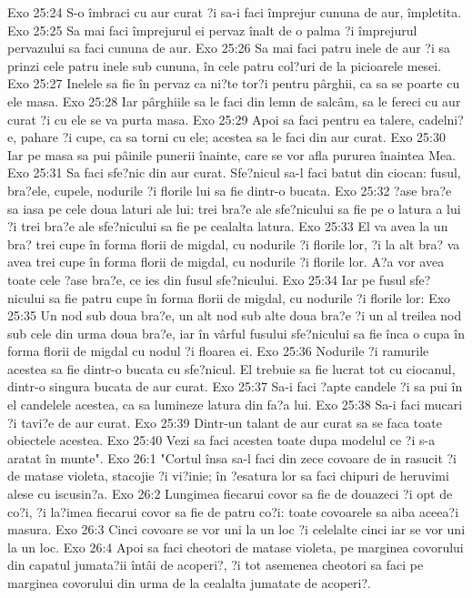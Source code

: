 Exo 25:24  S-o îmbraci cu aur curat ?i sa-i faci împrejur cununa de aur, împletita.
Exo 25:25  Sa mai faci împrejurul ei pervaz înalt de o palma ?i împrejurul pervazului sa faci cununa de aur.
Exo 25:26  Sa mai faci patru inele de aur ?i sa prinzi cele patru inele sub cununa, în cele patru col?uri de la picioarele mesei.
Exo 25:27  Inelele sa fie în pervaz ca ni?te tor?i pentru pârghii, ca sa se poarte cu ele masa.
Exo 25:28  Iar pârghiile sa le faci din lemn de salcâm, sa le fereci cu aur curat ?i cu ele se va purta masa.
Exo 25:29  Apoi sa faci pentru ea talere, cadelni?e, pahare ?i cupe, ca sa torni cu ele; acestea sa le faci din aur curat.
Exo 25:30  Iar pe masa sa pui pâinile punerii înainte, care se vor afla pururea înaintea Mea.
Exo 25:31  Sa faci sfe?nic din aur curat. Sfe?nicul sa-l faci batut din ciocan: fusul, bra?ele, cupele, nodurile ?i florile lui sa fie dintr-o bucata.
Exo 25:32  ?ase bra?e sa iasa pe cele doua laturi ale lui: trei bra?e ale sfe?nicului sa fie pe o latura a lui ?i trei bra?e ale sfe?nicului sa fie pe cealalta latura.
Exo 25:33  El va avea la un bra? trei cupe în forma florii de migdal, cu nodurile ?i florile lor, ?i la alt bra? va avea trei cupe în forma florii de migdal, cu nodurile ?i florile lor. A?a vor avea toate cele ?ase bra?e, ce ies din fusul sfe?nicului.
Exo 25:34  Iar pe fusul sfe?nicului sa fie patru cupe în forma florii de migdal, cu nodurile ?i florile lor:
Exo 25:35  Un nod sub doua bra?e, un alt nod sub alte doua bra?e ?i un al treilea nod sub cele din urma doua bra?e, iar în vârful fusului sfe?nicului sa fie înca o cupa în forma florii de migdal cu nodul ?i floarea ei.
Exo 25:36  Nodurile ?i ramurile acestea sa fie dintr-o bucata cu sfe?nicul. El trebuie sa fie lucrat tot cu ciocanul, dintr-o singura bucata de aur curat.
Exo 25:37  Sa-i faci ?apte candele ?i sa pui în el candelele acestea, ca sa lumineze latura din fa?a lui.
Exo 25:38  Sa-i faci mucari ?i tavi?e de aur curat.
Exo 25:39  Dintr-un talant de aur curat sa se faca toate obiectele acestea.
Exo 25:40  Vezi sa faci acestea toate dupa modelul ce ?i s-a aratat în munte".
Exo 26:1  "Cortul însa sa-l faci din zece covoare de in rasucit ?i de matase violeta, stacojie ?i vi?inie; în ?esatura lor sa faci chipuri de heruvimi alese cu iscusin?a.
Exo 26:2  Lungimea fiecarui covor sa fie de douazeci ?i opt de co?i, ?i la?imea fiecarui covor sa fie de patru co?i: toate covoarele sa aiba aceea?i masura.
Exo 26:3  Cinci covoare se vor uni la un loc ?i celelalte cinci iar se vor uni la un loc.
Exo 26:4  Apoi sa faci cheotori de matase violeta, pe marginea covorului din capatul jumata?ii întâi de acoperi?, ?i tot asemenea cheotori sa faci pe marginea covorului din urma de la cealalta jumatate de acoperi?.
